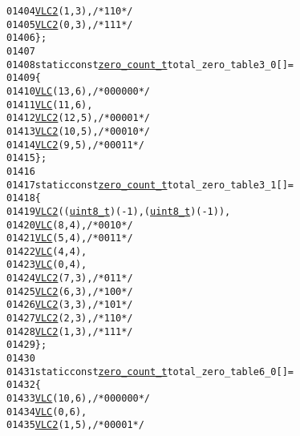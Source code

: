 \begin{footnotesize}
\begin{alltt}
01404         \hyperlink{vlc_8h_ad3cda36b9c6132357c7f7de5e52a6c93}{VLC2}(1, 3), \textcolor{comment}{/*110 */}
01405         \hyperlink{vlc_8h_ad3cda36b9c6132357c7f7de5e52a6c93}{VLC2}(0, 3), \textcolor{comment}{/*111 */}
01406 \};
01407 
01408 \textcolor{keyword}{static} \textcolor{keyword}{const} \hyperlink{structzero__count__t}{zero_count_t} total\_zero\_table3\_0[] = 
01409 \{
01410         \hyperlink{vlc_8h_a7f3572774a720fd9b4bc3b1a0b65082f}{VLC}(13, 6), \textcolor{comment}{/* 0000 00 */}
01411         \hyperlink{vlc_8h_a7f3572774a720fd9b4bc3b1a0b65082f}{VLC}(11, 6),
01412         \hyperlink{vlc_8h_ad3cda36b9c6132357c7f7de5e52a6c93}{VLC2}(12, 5),\textcolor{comment}{/* 0000 1 */}
01413         \hyperlink{vlc_8h_ad3cda36b9c6132357c7f7de5e52a6c93}{VLC2}(10, 5),\textcolor{comment}{/* 0001 0 */}
01414         \hyperlink{vlc_8h_ad3cda36b9c6132357c7f7de5e52a6c93}{VLC2}(9, 5), \textcolor{comment}{/* 0001 1 */}
01415 \};
01416 
01417 \textcolor{keyword}{static} \textcolor{keyword}{const} \hyperlink{structzero__count__t}{zero_count_t} total\_zero\_table3\_1[] = 
01418 \{
01419         \hyperlink{vlc_8h_ad3cda36b9c6132357c7f7de5e52a6c93}{VLC2}((\hyperlink{_types_8h_a363e4d606232036a6b89060813c45489}{uint8_t})(-1), (\hyperlink{_types_8h_a363e4d606232036a6b89060813c45489}{uint8_t})(-1)),
01420         \hyperlink{vlc_8h_a7f3572774a720fd9b4bc3b1a0b65082f}{VLC}(8, 4), \textcolor{comment}{/* 0010 */}
01421         \hyperlink{vlc_8h_a7f3572774a720fd9b4bc3b1a0b65082f}{VLC}(5, 4), \textcolor{comment}{/* 0011 */}
01422         \hyperlink{vlc_8h_a7f3572774a720fd9b4bc3b1a0b65082f}{VLC}(4, 4),
01423         \hyperlink{vlc_8h_a7f3572774a720fd9b4bc3b1a0b65082f}{VLC}(0, 4),
01424         \hyperlink{vlc_8h_ad3cda36b9c6132357c7f7de5e52a6c93}{VLC2}(7, 3),\textcolor{comment}{/* 011 */}
01425         \hyperlink{vlc_8h_ad3cda36b9c6132357c7f7de5e52a6c93}{VLC2}(6, 3),\textcolor{comment}{/* 100 */}
01426         \hyperlink{vlc_8h_ad3cda36b9c6132357c7f7de5e52a6c93}{VLC2}(3, 3), \textcolor{comment}{/*101 */}
01427         \hyperlink{vlc_8h_ad3cda36b9c6132357c7f7de5e52a6c93}{VLC2}(2, 3), \textcolor{comment}{/*110 */}
01428         \hyperlink{vlc_8h_ad3cda36b9c6132357c7f7de5e52a6c93}{VLC2}(1, 3), \textcolor{comment}{/*111 */}
01429 \};
01430 
01431 \textcolor{keyword}{static} \textcolor{keyword}{const} \hyperlink{structzero__count__t}{zero_count_t} total\_zero\_table6\_0[] = 
01432 \{
01433         \hyperlink{vlc_8h_a7f3572774a720fd9b4bc3b1a0b65082f}{VLC}(10, 6), \textcolor{comment}{/* 0000 00 */}
01434         \hyperlink{vlc_8h_a7f3572774a720fd9b4bc3b1a0b65082f}{VLC}(0, 6),
01435         \hyperlink{vlc_8h_ad3cda36b9c6132357c7f7de5e52a6c93}{VLC2}(1, 5),\textcolor{comment}{/* 0000 1 */}

\end{alltt}
\end{footnotesize}
